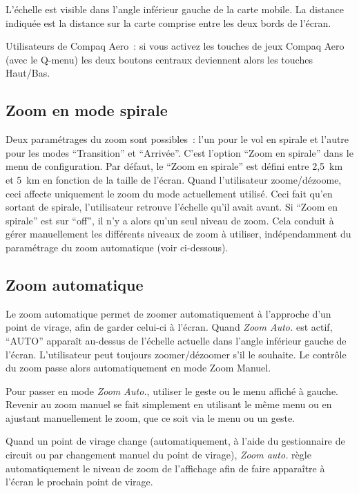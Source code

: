 L'échelle est visible dans l'angle inférieur gauche de la carte mobile.
La distance indiquée est la distance sur la carte comprise entre les deux bords de l'écran.

Utilisateurs de Compaq Aero~: si vous activez les touches de jeux Compaq Aero (avec le Q-menu) les deux boutons centraux deviennent alors les touches Haut/Bas.

\subsection*{Zoom en mode spirale}
Deux paramétrages du zoom sont possibles~: l'un pour le vol en spirale et l'autre pour les modes ``Transition'' et ``Arrivée''.
C'est l'option ``Zoom en spirale'' dans le  menu de configuration.
Par défaut, le ``Zoom en spirale'' est défini entre 2,5~km et 5~km en fonction de la taille de l'écran.
Quand l'utilisateur zoome/dézoome, ceci affecte uniquement le zoom du mode actuellement utilisé.
Ceci fait qu'en sortant de spirale, l'utilisateur retrouve l'échelle qu'il avait avant.
Si ``Zoom en spirale'' est sur ``off'', il n'y a alors qu'un seul niveau de zoom.
Cela conduit à gérer manuellement les différents niveaux de zoom à utiliser, indépendamment du paramétrage du zoom automatique (voir ci-dessous).

\subsection*{Zoom automatique}
Le zoom automatique permet de zoomer automatiquement à l'approche d'un point de virage, afin de garder celui-ci à l'écran. Quand \emph{Zoom Auto.} est actif, ``AUTO'' apparaît au-dessus de l'échelle actuelle dans l'angle inférieur gauche de l'écran. L'utilisateur peut toujours zoomer/dézoomer s'il le souhaite. Le contrôle du zoom passe alors automatiquement en mode Zoom Manuel.

Pour passer en mode \emph{Zoom Auto.}, utiliser le geste 
ou le menu affiché à gauche. 
Revenir au zoom manuel se fait simplement en utilisant le même menu
ou en ajustant manuellement le zoom, que ce soit via le menu ou un geste.

Quand un point de virage change (automatiquement, à l'aide du gestionnaire de circuit ou par changement manuel du point de virage), \emph{Zoom auto.} règle automatiquement le niveau de zoom de l'affichage
afin de faire apparaître à l'écran le prochain point de virage.

